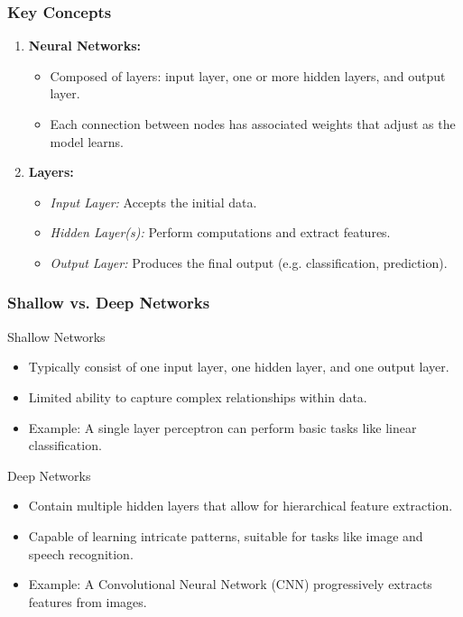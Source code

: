 \documentclass[aspectratio=169]{beamer}
\begin{document}
\begin{frame}[fragile]
    \frametitle{Key Concepts}
    \begin{enumerate}
        \item \textbf{Neural Networks:}
        \begin{itemize}
            \item Composed of layers: input layer, one or more hidden layers, and output layer.
            \item Each connection between nodes has associated weights that adjust as the model learns.
        \end{itemize}
        \item \textbf{Layers:}
        \begin{itemize}
            \item \textit{Input Layer:} Accepts the initial data.
            \item \textit{Hidden Layer(s):} Perform computations and extract features.
            \item \textit{Output Layer:} Produces the final output (e.g. classification, prediction).
        \end{itemize}
    \end{enumerate}
\end{frame}

\begin{frame}[fragile]
    \frametitle{Shallow vs. Deep Networks}
    \begin{block}{Shallow Networks}
        \begin{itemize}
            \item Typically consist of one input layer, one hidden layer, and one output layer.
            \item Limited ability to capture complex relationships within data.
            \item Example: A single layer perceptron can perform basic tasks like linear classification.
        \end{itemize}
    \end{block}
    
    \begin{block}{Deep Networks}
        \begin{itemize}
            \item Contain multiple hidden layers that allow for hierarchical feature extraction.
            \item Capable of learning intricate patterns, suitable for tasks like image and speech recognition.
            \item Example: A Convolutional Neural Network (CNN) progressively extracts features from images.
        \end{itemize}
    \end{block}
\end{frame}
\end{document}
